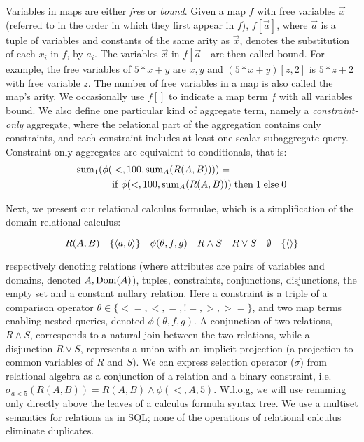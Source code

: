 Variables in maps are either {\em free} or {\em bound}.
Given a map $f$ with free variables $\vec{x}$ (referred to in the order in which
they first appear in $f$), $f[\vec{a}]$, where $\vec{a}$ is a tuple of variables
and constants of the same arity as $\vec{x}$, denotes the substitution of each
$x_i$ in $f$, by $a_i$. The variables $\vec{x}$ in $f[\vec{a}]$ are then called
bound.  For example, the free variables of $5 * x + y$ are $x,y$ and $(5 * x +
y)[z, 2]$ is $5 * z + 2$ with free variable $z$.  The number of free variables
in a map is also called the map's arity.  We occasionally use $f[]$ to indicate
a map term $f$ with all variables bound.
We also define one particular kind of aggregate term, namely a
\textit{constraint-only} aggregate, where the relational part of the aggregation
contains only constraints, and each constraint includes at least one scalar
subaggregate query. Constraint-only aggregates are equivalent to conditionals,
that is:
\begin{align*}
\mathrm{sum}_{1}(\phi( & <,100,\mathrm{sum}_{A}(R(A,B)))) =\\
& \mathrm{if} \; \phi(<,100,\mathrm{sum}_{A}(R(A,B))) \; \mathrm{then} \; 1 \; \mathrm{else} \; 0
\end{align*}

Next, we present our relational calculus formulae, which is a simplification of
the domain relational calculus:

\vspace{-3mm}
\[
R(A,B)
\quad
\{{\langle a,b\rangle}\}
\quad
\phi(\theta,f,g)
\quad
R \wedge S
\quad
R \vee S
\quad
\emptyset
\quad
\{{\langle\rangle}\}
\]

\noindent respectively denoting relations (where attributes are pairs of
variables and domains, denoted $A, \mathrm{Dom}(A)$), tuples, constraints, conjunctions,
disjunctions, the empty set and a constant nullary relation. Here a constraint
is a triple of a comparison operator $\theta \in \{<=,<,=,!=,>,>=\}$, and two
map terms enabling nested queries, denoted $\phi(\theta, f, g)$.  A conjunction
of two relations, $R \wedge S$, corresponds to a natural join between the two
relations, while a disjunction $R \vee S$, represents a union with an implicit
projection (a projection to common variables of $R$ and $S$).
We can express selection operator ($\sigma$) from relational algebra as a
conjunction of a relation and a binary constraint, i.e.  $\sigma_{a<5}(R(A,B))
= R(A,B) \wedge \phi(<,A,5)$.  W.l.o.g, we will use renaming only directly above
the leaves of a calculus formula syntax tree.  We use a multiset semantics for
relations as in SQL; none of the operations of relational calculus eliminate
duplicates.

